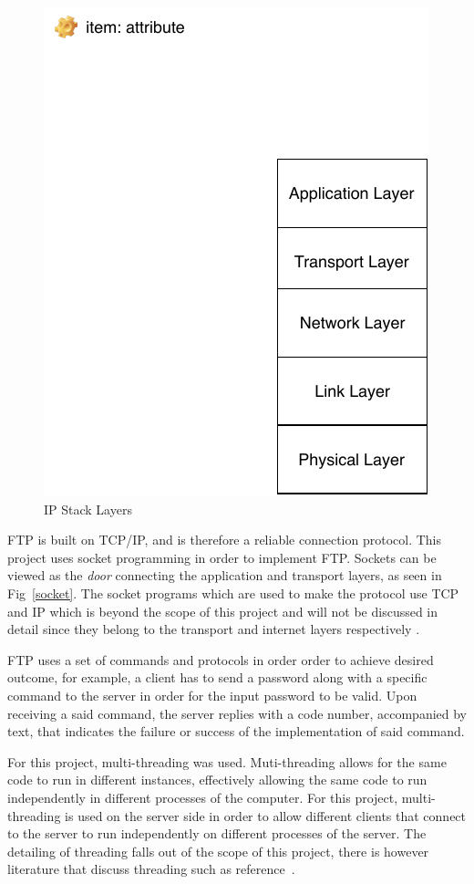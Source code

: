 \documentclass[journal, a4paper]{IEEEtran}
\begin{document}
\begin{figure}[hbtp!]
	\centering
	\includegraphics[scale = 1.2]{IPStack}
	\caption{IP Stack Layers}
	\label {ipstack}
\end{figure}


FTP is built on TCP/IP, and is therefore a reliable connection protocol. This project uses socket programming in order to implement FTP. Sockets can be viewed as the \textit{door} connecting the application and transport layers, as seen in Fig~\ref{socket}. The socket programs which are used to make the protocol use TCP and IP which is beyond the scope of this project and will not be discussed in detail since they belong to the transport and internet layers respectively \cite{cn}.

FTP uses a set of commands and protocols in order order to achieve desired outcome, for example, a client has to send a password along with a specific command to the server in order for the input password to be valid. Upon receiving a said command, the server replies with a code number, accompanied by text, that indicates the failure or success of the implementation of said command. 


For this project, multi-threading was used. Muti-threading allows for the same code to run in different instances, effectively allowing the same code to run independently in different processes of the computer. For this project, multi-threading is used on the server side in order to allow different clients that connect to the server to run independently on different processes of the server. The detailing of threading falls out of the scope of this project, there is however literature that discuss threading such as reference~\cite{fop}.
\end{document}
